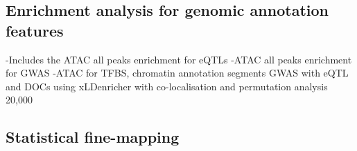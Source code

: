  \subsection{Enrichment analysis for genomic annotation features}
-Includes the ATAC all peaks enrichment for eQTLs 
-ATAC all peaks enrichment for GWAS
-ATAC for TFBS, chromatin annotation segments
GWAS with eQTL and DOCs using xLDenricher with co-localisation and permutation analysis 20,000

\subsection{Statistical fine-mapping}

